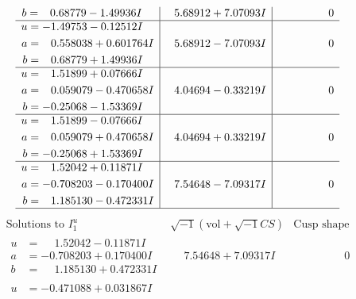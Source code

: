 \documentclass[1p]{elsarticle_modified}
\theoremstyle{definition}
\newcommand{\I}{\sqrt{-1}}
\begin{document}
$$\begin{array}{c|c|c}
\begin{aligned}
b &= \phantom{-}0.68779 - 1.49936 I\end{aligned}
 & \phantom{-}5.68912 + 7.07093 I & \phantom{-0.000000 } 0 \\ \hline\begin{aligned}
u &= -1.49753 - 0.12512 I \\
a &= \phantom{-}0.558038 + 0.601764 I \\
b &= \phantom{-}0.68779 + 1.49936 I\end{aligned}
 & \phantom{-}5.68912 - 7.07093 I & \phantom{-0.000000 } 0 \\ \hline\begin{aligned}
u &= \phantom{-}1.51899 + 0.07666 I \\
a &= \phantom{-}0.059079 - 0.470658 I \\
b &= -0.25068 - 1.53369 I\end{aligned}
 & \phantom{-}4.04694 - 0.33219 I & \phantom{-0.000000 } 0 \\ \hline\begin{aligned}
u &= \phantom{-}1.51899 - 0.07666 I \\
a &= \phantom{-}0.059079 + 0.470658 I \\
b &= -0.25068 + 1.53369 I\end{aligned}
 & \phantom{-}4.04694 + 0.33219 I & \phantom{-0.000000 } 0 \\ \hline\begin{aligned}
u &= \phantom{-}1.52042 + 0.11871 I \\
a &= -0.708203 - 0.170400 I \\
b &= \phantom{-}1.185130 - 0.472331 I\end{aligned}
 & \phantom{-}7.54648 - 7.09317 I & \phantom{-0.000000 } 0\\
 \hline 
 \end{array}$$\newpage$$\begin{array}{c|c|c}  
\text{Solutions to }I^u_{1}& \I (\text{vol} + \sqrt{-1}CS) & \text{Cusp shape}\\
 \hline 
\begin{aligned}
u &= \phantom{-}1.52042 - 0.11871 I \\
a &= -0.708203 + 0.170400 I \\
b &= \phantom{-}1.185130 + 0.472331 I\end{aligned}
 & \phantom{-}7.54648 + 7.09317 I & \phantom{-0.000000 } 0 \\ \hline\begin{aligned}
u &= -0.471088 + 0.031867 I \\

\end{aligned}
\end{array}$$
\end{document}
